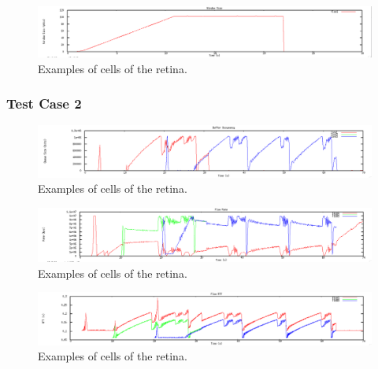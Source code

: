 \documentclass[12pt]{article}
\begin{document}
\begin{figure}[!ht]
\centering \includegraphics[bb= 0 0 1300 250, scale=.35]{figures/Test1_Vegas/window_size.png}
\caption{Examples of cells of the retina.}
\label{fig:test1_vegas_window_size}
\end{figure}

\newpage


\subsubsection{Test Case 2}

\begin{figure}[!ht]
\centering \includegraphics[bb= 0 0 1300 250, scale=.35]{figures/Test2_Tahoe/buffer_occ.png}
\caption{Examples of cells of the retina.}
\label{fig:test2_tahoe_buffer_occ}
\end{figure}

\begin{figure}[!ht]
\centering \includegraphics[bb= 0 0 1300 250, scale=.35]{figures/Test2_Tahoe/flow_rate.png}
\caption{Examples of cells of the retina.}
\label{fig:test2_tahoe_flow_rate}
\end{figure}

\begin{figure}[!ht]
\centering \includegraphics[bb= 0 0 1300 250, scale=.35]{figures/Test2_Tahoe/flow_rtt.png}
\caption{Examples of cells of the retina.}
\label{fig:test2_tahoe_flow_rtt}
\end{figure}
\end{document}
